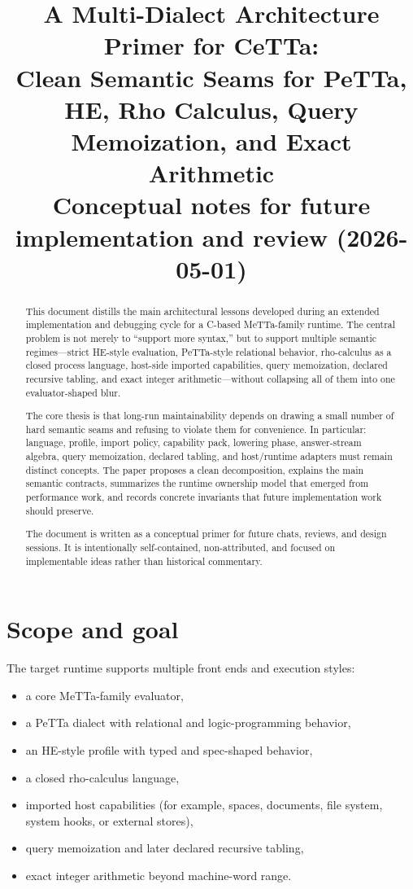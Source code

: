 \documentclass[11pt]{article}
\title{A Multi-Dialect Architecture Primer for CeTTa:\\
Clean Semantic Seams for PeTTa, HE, Rho Calculus, Query Memoization, and Exact Arithmetic\\
\large Conceptual notes for future implementation and review (2026-05-01)}
\author{}
\date{}
\begin{document}
\maketitle

\begin{abstract}
This document distills the main architectural lessons developed during an extended implementation and debugging cycle for a C-based MeTTa-family runtime. The central problem is not merely to ``support more syntax,'' but to support multiple semantic regimes---strict HE-style evaluation, PeTTa-style relational behavior, rho-calculus as a closed process language, host-side imported capabilities, query memoization, declared recursive tabling, and exact integer arithmetic---without collapsing all of them into one evaluator-shaped blur.

The core thesis is that long-run maintainability depends on drawing a small number of hard semantic seams and refusing to violate them for convenience. In particular: language, profile, import policy, capability pack, lowering phase, answer-stream algebra, query memoization, declared tabling, and host/runtime adapters must remain distinct concepts. The paper proposes a clean decomposition, explains the main semantic contracts, summarizes the runtime ownership model that emerged from performance work, and records concrete invariants that future implementation work should preserve.

The document is written as a conceptual primer for future chats, reviews, and design sessions. It is intentionally self-contained, non-attributed, and focused on implementable ideas rather than historical commentary.
\end{abstract}

\tableofcontents

\section{Scope and goal}

The target runtime supports multiple front ends and execution styles:
\begin{itemize}
    \item a core MeTTa-family evaluator,
    \item a PeTTa dialect with relational and logic-programming behavior,
    \item an HE-style profile with typed and spec-shaped behavior,
    \item a closed rho-calculus language,
    \item imported host capabilities (for example, spaces, documents, file system, system hooks, or external stores),
    \item query memoization and later declared recursive tabling,
    \item exact integer arithmetic beyond machine-word range.
\end{itemize}
\end{document}
